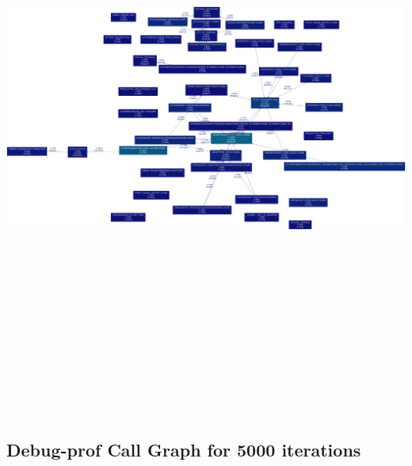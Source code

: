 \documentclass[11pt]{article}
\begin{document}
	\includegraphics[width=525pt, height=525pt]{../plots/improved_graph_500.png}\\\\

	\subsection{Debug-prof Call Graph for 5000 iterations}
\end{document}
